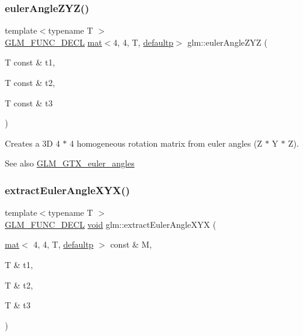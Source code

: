 \subsubsection{\texorpdfstring{euler\+Angle\+Z\+Y\+Z()}{eulerAngleZYZ()}}
{\footnotesize\ttfamily template$<$typename T $>$ \\
\hyperlink{setup_8hpp_ab2d052de21a70539923e9bcbf6e83a51}{G\+L\+M\+\_\+\+F\+U\+N\+C\+\_\+\+D\+E\+CL} \hyperlink{structglm_1_1mat}{mat}$<$4, 4, T, \hyperlink{namespaceglm_a36ed105b07c7746804d7fdc7cc90ff25a9d21ccd8b5a009ec7eb7677befc3bf51}{defaultp}$>$ glm\+::euler\+Angle\+Z\+YZ (\begin{DoxyParamCaption}\item[{T const \&}]{t1,  }\item[{T const \&}]{t2,  }\item[{T const \&}]{t3 }\end{DoxyParamCaption})}

Creates a 3D 4 $\ast$ 4 homogeneous rotation matrix from euler angles (Z $\ast$ Y $\ast$ Z). \begin{DoxySeeAlso}{See also}
\hyperlink{group__gtx__euler__angles}{G\+L\+M\+\_\+\+G\+T\+X\+\_\+euler\+\_\+angles} 
\end{DoxySeeAlso}
\mbox{\label{group__gtx__euler__angles_gaf1077a72171d0f3b08f022ab5ff88af7}} 
\subsubsection{\texorpdfstring{extract\+Euler\+Angle\+X\+Y\+X()}{extractEulerAngleXYX()}}
{\footnotesize\ttfamily template$<$typename T $>$ \\
\hyperlink{setup_8hpp_ab2d052de21a70539923e9bcbf6e83a51}{G\+L\+M\+\_\+\+F\+U\+N\+C\+\_\+\+D\+E\+CL} \hyperlink{_s_d_l__opengles2__gl2ext_8h_ae5d8fa23ad07c48bb609509eae494c95}{void} glm\+::extract\+Euler\+Angle\+X\+YX (\begin{DoxyParamCaption}\item[{\hyperlink{structglm_1_1mat}{mat}$<$ 4, 4, T, \hyperlink{namespaceglm_a36ed105b07c7746804d7fdc7cc90ff25a9d21ccd8b5a009ec7eb7677befc3bf51}{defaultp} $>$ const \&}]{M,  }\item[{T \&}]{t1,  }\item[{T \&}]{t2,  }\item[{T \&}]{t3 }\end{DoxyParamCaption})}

